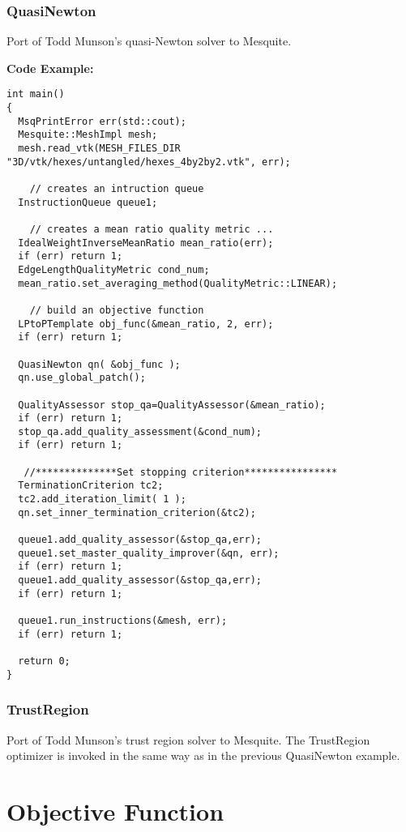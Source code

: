 \subsubsection{QuasiNewton}
Port of Todd Munson's quasi-Newton solver to Mesquite.

\textbf{Code Example:}

\begin{lstlisting}[frame=single]
int main()
{
  MsqPrintError err(std::cout);
  Mesquite::MeshImpl mesh;
  mesh.read_vtk(MESH_FILES_DIR "3D/vtk/hexes/untangled/hexes_4by2by2.vtk", err);
  
    // creates an intruction queue
  InstructionQueue queue1;
  
    // creates a mean ratio quality metric ...
  IdealWeightInverseMeanRatio mean_ratio(err);
  if (err) return 1;
  EdgeLengthQualityMetric cond_num;
  mean_ratio.set_averaging_method(QualityMetric::LINEAR);
  
    // build an objective function
  LPtoPTemplate obj_func(&mean_ratio, 2, err);
  if (err) return 1;

  QuasiNewton qn( &obj_func );
  qn.use_global_patch();
  
  QualityAssessor stop_qa=QualityAssessor(&mean_ratio);
  if (err) return 1;
  stop_qa.add_quality_assessment(&cond_num);
  if (err) return 1;
    
   //**************Set stopping criterion****************
  TerminationCriterion tc2;
  tc2.add_iteration_limit( 1 );
  qn.set_inner_termination_criterion(&tc2);

  queue1.add_quality_assessor(&stop_qa,err);
  queue1.set_master_quality_improver(&qn, err); 
  if (err) return 1;
  queue1.add_quality_assessor(&stop_qa,err);
  if (err) return 1;

  queue1.run_instructions(&mesh, err);
  if (err) return 1;
  
  return 0;
}
\end{lstlisting}


\subsubsection{TrustRegion}
Port of Todd Munson's trust region solver to Mesquite.  The TrustRegion optimizer is invoked in the same way as in the previous QuasiNewton example.


\section{Objective Function}
\label{sec:ObjectiveFunction}

